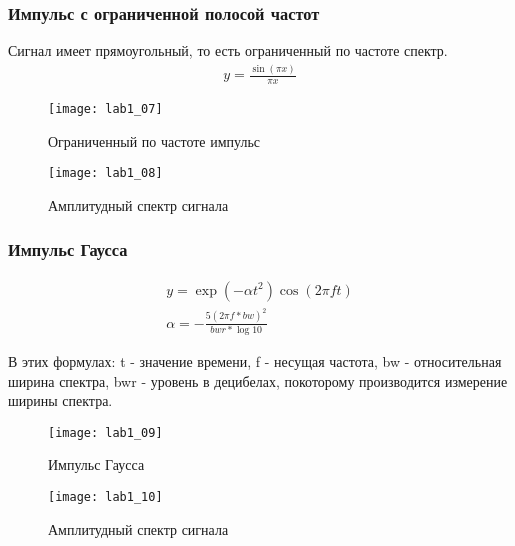 \subsubsection{Импульс с ограниченной полосой частот}
Сигнал имеет прямоугольный, то есть ограниченный по частоте спектр.
\begin{eqnarray}
y = \frac{\sin(\pi x)}{\pi x}
\end{eqnarray}
\begin{figure}[H]
	\begin{center}
		\texttt{[image: lab1\_07]}
		\caption{Ограниченный по частоте импульс} 
		\label{pic:lab1_07} %
	\end{center}
\end{figure}

\begin{figure}[H]
	\begin{center}
		\texttt{[image: lab1\_08]}
		\caption{Амплитудный спектр сигнала} 
		\label{pic:lab1_08} %
	\end{center}
\end{figure}

\subsubsection{Импульс Гаусса}


\begin{eqnarray}
y = \exp(-\alpha t^2)\cos(2\pi f t)\\
\alpha = -\frac{5(2\pi f *bw)^2}{bwr *\log 10}
\end{eqnarray}

В этих формулах: t - значение времени, f - несущая частота, bw - относительная ширина спектра,
bwr - уровень в децибелах, покоторому производится измерение ширины спектра.

\begin{figure}[H]
	\begin{center}
		\texttt{[image: lab1\_09]}
		\caption{Импульс Гаусса} 
		\label{pic:lab1_09} %
	\end{center}
\end{figure}

\begin{figure}[H]
	\begin{center}
		\texttt{[image: lab1\_10]}
		\caption{Амплитудный спектр сигнала} 
		\label{pic:lab1_10} %
	\end{center}
\end{figure}


